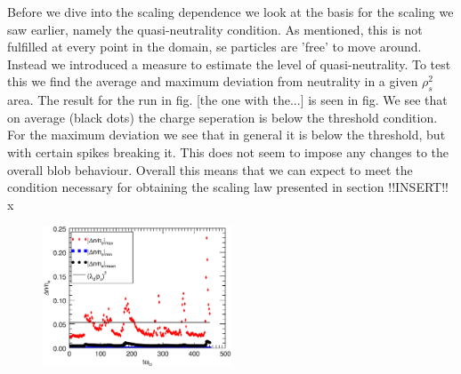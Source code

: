 \documentclass[9pt,twocolumn]{article}
\renewcommand{\=}[1]{\stackrel{#1}{=}} %
\theoremstyle{definition}
\theoremstyle{remark}
\begin{document}
Before we dive into the scaling dependence we look at the basis for the scaling we saw earlier, namely the quasi-neutrality condition. As mentioned, this is not fulfilled at every point in the domain, se particles are 'free' to move around. Instead we introduced a measure to estimate the level of quasi-neutrality. To test this we find the average and maximum deviation from neutrality in a given $\rho_s^2$ area. The result for the run in fig. [the one with the...] is seen in fig. We see that on average (black dots) the charge seperation is below the threshold condition. For the maximum deviation we see that in general it is below the threshold, but with certain spikes breaking it. This does not seem to impose any changes to the overall blob behaviour. Overall this means that we can expect to meet the condition necessary for obtaining the scaling law presented in section !!INSERT!!
x

\begin{figure}[h]
\center
	\includegraphics[width=0.5\textwidth]{Pictures/quasineuwl.eps}
\end{figure}
\end{document}
